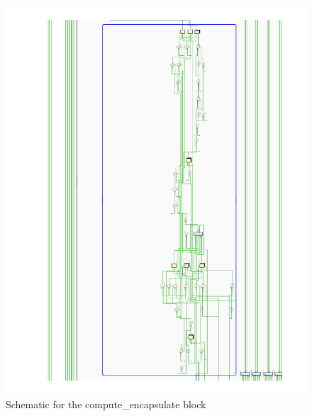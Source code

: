    \begin{figure}[H]
        \centering
        \includegraphics[width=\textwidth]{annexes/compute_encapsulate.pdf}
        \caption{Schematic for the compute\_encapsulate block}
        \label{anx:compute_encapsulate}
    \end{figure}
    \pagebreak
